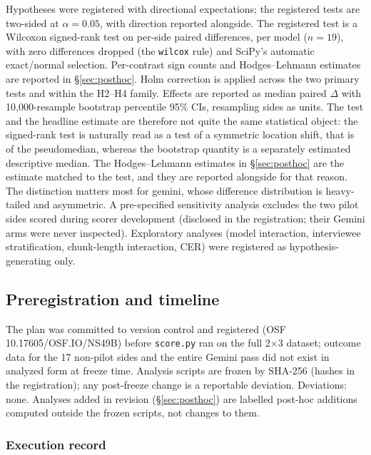 \documentclass[11pt]{article}
\begin{document}
Hypotheses were registered with directional expectations; the registered tests are two-sided at $\alpha = 0.05$, with direction reported alongside. The registered test is a Wilcoxon signed-rank test \citep{wilcoxon45} on per-side paired differences, per model ($n = 19$), with zero differences dropped (the \texttt{wilcox} rule) and SciPy's automatic exact/normal selection. Per-contrast sign counts and Hodges--Lehmann estimates are reported in \S\ref{sec:posthoc}. Holm correction \citep{holm79} is applied across the two primary tests and within the H2--H4 family. Effects are reported as median paired $\Delta$ with 10{,}000-resample bootstrap percentile 95\% CIs, resampling sides as units. The test and the headline estimate are therefore not quite the same statistical object: the signed-rank test is naturally read as a test of a symmetric location shift, that is of the pseudomedian, whereas the bootstrap quantity is a separately estimated descriptive median. The Hodges--Lehmann estimates in \S\ref{sec:posthoc} are the estimate matched to the test, and they are reported alongside for that reason. The distinction matters most for gemini, whose difference distribution is heavy-tailed and asymmetric. A pre-specified sensitivity analysis excludes the two pilot sides scored during scorer development (disclosed in the registration; their Gemini arms were never inspected). Exploratory analyses (model interaction, interviewee stratification, chunk-length interaction, CER) were registered as hypothesis-generating only.

\subsection{Preregistration and timeline}
\label{sec:timeline}

The plan was committed to version control and registered (OSF 10.17605/OSF.IO/NS49B) before \texttt{score.py} ran on the full 2$\times$3 dataset; outcome data for the 17 non-pilot sides and the entire Gemini pass did not exist in analyzed form at freeze time. Analysis scripts are frozen by SHA-256 (hashes in the registration); any post-freeze change is a reportable deviation. Deviations: none. Analyses added in revision (\S\ref{sec:posthoc}) are labelled post-hoc additions computed outside the frozen scripts, not changes to them.

\subsubsection*{Execution record}
\end{document}
